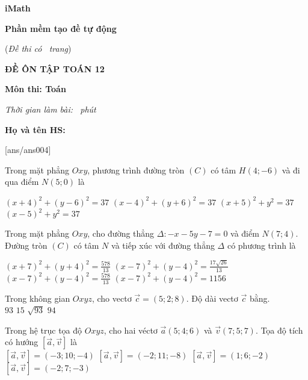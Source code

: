 \documentclass[12pt,a4paper]{article}
\newcommand{\tenso}{iMath}
\newcommand{\tentruong}{Phần mềm tạo đề tự động}
\newcommand{\tenkythi}{ĐỀ ÔN TẬP TOÁN 12}
\newcommand{\tenmonthi}{Môn thi: Toán}
\newcommand{\thoigian}{}
\newcommand{\tieude}[2]{
    \noindent
    \begin{minipage}[b]{7cm}
        \centerline{\textbf{\fontsize{13}{0}\selectfont \tenso}}
        \centerline{\textbf{\fontsize{13}{0}\selectfont \tentruong}}
        \centerline{(\textit{Đề thi có #1\ trang})}
    \end{minipage}\hspace{1.5cm}
    \begin{minipage}[b]{9cm}
        \centerline{\textbf{\fontsize{13}{0}\selectfont \tenkythi}}
        \centerline{\textbf{\fontsize{13}{0}\selectfont \tenmonthi}}
        \centerline{\textit{\fontsize{12}{0}\selectfont Thời gian làm bài: \thoigian\ phút}}
    \end{minipage}
    \begin{minipage}[b]{10cm}
        \textbf{Họ và tên HS: }{\tiny\dotfill}
    \end{minipage}
    \begin{minipage}[b]{8cm}
        \hspace*{4cm}\fbox{\bf Mã đề: #2}
    \end{minipage}\vspace{3pt}
}
\newcommand{\chantrang}[2]{\rfoot{Trang \thepage $-$ Mã đề #2}}
\begin{document}


\tieude{\pageref{LastPage}}{004}

\chantrang{\pageref{LastPage}}{004}

\setcounter{page}{1}

\setcounter{ex}{0}
[ans/ans004]
\begin{ex}
 Trong mặt phẳng ${Oxy}$, phương trình đường tròn ${(C)}$ có tâm ${H(4;-6)}$ và đi qua điểm $N(5;0)$ là
 
\choice
{ $\left(x + 4\right)^{2}+\left(y - 6\right)^{2}=37$ }
   { \True $\left(x - 4\right)^{2}+\left(y + 6\right)^{2}=37$ }
     { $\left(x + 5\right)^{2}+y^{2}=37$ }
    { $\left(x - 5\right)^{2}+y^{2}=37$ }
\end{ex}

\begin{ex}
 Trong mặt phẳng ${Oxy}$, cho đường thẳng $\Delta: - x - 5 y - 7=0$ và điểm ${N(7;4)}$. Đường tròn ${(C)}$ có tâm ${N}$ và tiếp xúc với đường thẳng $\Delta$ có phương trình là
 
\choice
{ $\left(x + 7\right)^{2}+\left(y + 4\right)^{2}=\frac{578}{13}$ }
   { $\left(x - 7\right)^{2}+\left(y - 4\right)^{2}=\frac{17 \sqrt{26}}{13}$ }
     { \True $\left(x - 7\right)^{2}+\left(y - 4\right)^{2}=\frac{578}{13}$ }
    { $\left(x - 7\right)^{2}+\left(y - 4\right)^{2}=1156$ }
\end{ex}

\begin{ex}
 Trong không gian ${Oxyz}$, cho vectơ $\overrightarrow{c}=(5;2;8)$. Độ dài vectơ $\overrightarrow{c}$ bằng.\\ 
\choice
{ ${93}$ }
   { ${15}$ }
     { \True ${\sqrt{93}}$ }
    { ${94}$ }
\end{ex}

\begin{ex}
 Trong hệ trục tọa độ ${Oxyz}$, cho hai véctơ $\overrightarrow{a}(5;4;6)$ và $\overrightarrow{v}(7;5;7)$. Tọa độ tích có hướng $\left[\overrightarrow{a},\overrightarrow{v}\right]$ là\\ 
\choice
{ $\left[\overrightarrow{a},\overrightarrow{v}\right]=(-3;10;-4)$ }
   { $\left[\overrightarrow{a},\overrightarrow{v}\right]=(-2;11;-8)$ }
     { $\left[\overrightarrow{a},\overrightarrow{v}\right]=(1;6;-2)$ }
    { \True $\left[\overrightarrow{a},\overrightarrow{v}\right]= (-2;7;-3)$ }
\end{ex}
\end{document}
